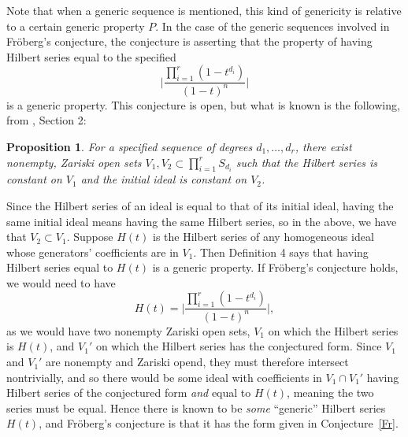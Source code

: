 \documentclass[11pt]{article}
\newtheorem{proposition}{Proposition}
\theoremstyle{definition}
\begin{document}
Note that when a generic sequence is mentioned, this kind of genericity is relative to a certain generic property $P$. In the case of the generic sequences involved in Fröberg's conjecture, the conjecture is asserting that the property of having Hilbert series equal to the specified \[ \bigg| \frac{\prod_{i=1}^r (1 - t^{d_i})}{(1 - t)^n} \bigg| \] is a generic property. This conjecture is open, but what is known is the following, from \cite{pardue2010generic}, Section 2:


\begin{proposition}\label{prop:V1V2}
	For a specified sequence of degrees $d_1, \dots, d_r$, there exist nonempty, Zariski open sets $V_1, V_2 \subset \prod_{i = 1}^r S_{d_i}$ such that the Hilbert series is constant on $V_1$ and the initial ideal is constant on $V_2$. 
\end{proposition}


Since the Hilbert series of an ideal is equal to that of its initial ideal, having the same initial ideal means having the same Hilbert series, so in the above, we have that $V_2 \subset V_1$. Suppose $H(t)$ is the Hilbert series of any homogeneous ideal whose generators' coefficients are in $V_1$. Then Definition 4 says that having Hilbert series equal to $H(t)$ is a generic property. If Fröberg's conjecture holds, we would need to have \[ H(t) = \bigg| \frac{\prod_{i=1}^r (1 - t^{d_i})}{(1 - t)^n} \bigg|, \] as we would have two nonempty Zariski open sets, $V_1$ on which the Hilbert series is $H(t)$, and $V_1'$ on which the Hilbert series has the conjectured form. Since $V_1$ and $V_1'$ are nonempty and Zariski opend, they must therefore intersect nontrivially, and so there would be some ideal with coefficients in $V_1 \cap V_1'$ having Hilbert series of the conjectured form \emph{and} equal to $H(t)$, meaning the two series must be equal. Hence there is known to be \emph{some} ``generic'' Hilbert series $H(t)$, and Fröberg's conjecture is that it has the form given in Conjecture~\ref{Fr}.
\end{document}
